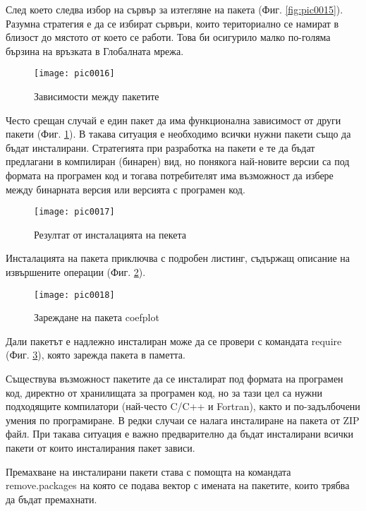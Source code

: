 След което следва избор на сървър за изтегляне на пакета (Фиг. \ref{fig:pic0015}). Разумна стратегия е да се избират сървъри, които териториално се намират в близост до мястото от което се работи. Това би осигурило малко по-голяма бързина на връзката в Глобалната мрежа. 

\begin{figure}[h!]
  \centering
  \texttt{[image: pic0016]}
  \caption{Зависимости между пакетите}
\label{fig:pic0016}
\end{figure}
\FloatBarrier

Често срещан случай е един пакет да има функционална зависимост от други пакети (Фиг. \ref{fig:pic0016}). В такава ситуация е необходимо всички нужни пакети също да бъдат инсталирани. Стратегията при разработка на пакети е те да бъдат предлагани в компилиран (бинарен) вид, но понякога най-новите версии са под формата на програмен код и тогава потребителят има възможност да избере между бинарната версия или версията с програмен код. 

\begin{figure}[h!]
  \centering
  \texttt{[image: pic0017]}
  \caption{Резултат от инсталацията на пекета}
\label{fig:pic0017}
\end{figure}
\FloatBarrier

Инсталацията на пакета приключва с подробен листинг, съдържащ описание на извършените операции (Фиг. \ref{fig:pic0017}). 

\begin{figure}[h!]
  \centering
  \texttt{[image: pic0018]}
  \caption{Зареждане на пакета coefplot}
\label{fig:pic0018}
\end{figure}
\FloatBarrier

Дали пакетът е надлежно инсталиран може да се провери с командата require (Фиг. \ref{fig:pic0018}), която зарежда пакета в паметта. 

Съществува възможност пакетите да се инсталират под формата на програмен код, директно от хранилищата за програмен код, но за тази цел са нужни подходящите компилатори (най-често C/C++ и Fortran), както и по-задълбочени умения по програмиране. В редки случаи се налага инсталиране на пакета от ZIP файл. При такава ситуация е важно предварително да бъдат инсталирани всички пакети от които инсталирания пакет зависи. 

Премахване на инсталирани пакети става с помощта на командата remove.packages на която се подава вектор с имената на пакетите, които трябва да бъдат премахнати.

